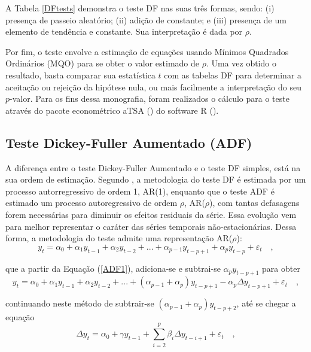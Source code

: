 A Tabela \ref{DFtests} demonstra o teste DF nas suas três formas, sendo: (i) presença de passeio aleatório; (ii) adição de constante; e (iii) presença de um elemento de tendência e constante. Sua interpretação é dada por $\rho$. 


Por fim, o teste envolve a estimação de equações usando Mínimos Quadrados Ordinários (MQO) para se obter o valor estimado de $\rho$. Uma vez obtido o resultado, basta comparar sua estatística $t$ com as tabelas DF para determinar a aceitação ou rejeição da hipótese nula, ou mais facilmente a interpretação do seu $p$-valor. Para os fins dessa monografia, foram realizados o cálculo para o teste através do pacote econométrico aTSA () do software R ().

\subsection{Teste Dickey-Fuller Aumentado (ADF)}

A diferença entre o teste Dickey-Fuller Aumentado e o teste DF simples, está na sua ordem de estimação. Segundo , a metodologia do teste DF é estimada por um processo autorregressivo de ordem 1, AR(1), enquanto que o teste ADF é estimado um processo autoregressivo de ordem $\rho$, AR($\rho$), com tantas defasagens forem necessárias para diminuir os efeitos residuais da série. Essa evolução vem para melhor representar o caráter das séries temporais não-estacionárias. Dessa forma, a metodologia do teste admite uma representação AR($\rho$): 
\begin{equation}\label{ADF1}
    y_t = \alpha_0 + \alpha_1 y_{t-1} + \alpha_2 y_{t-2} + ... + \alpha_{p-1} y_{t-p+1} + \alpha_p y_{t-p} + \varepsilon_t\quad,
\end{equation}

\noindent que a partir da Equação (\ref{ADF1}), adiciona-se e subtrai-se $\alpha_p y_{t-p+1}$ para obter
\begin{equation}\label{ADF2}
    y_t = \alpha_0 + \alpha_1 y_{t-1} + \alpha_2 y_{t-2} + ... + (\alpha_{p-1} + \alpha_p) y_{t-p+1} - \alpha_p \Delta y_{t-p+1} + \varepsilon_t \quad,
\end{equation}

\noindent continuando neste método de subtrair-se $(\alpha_{p-1} + \alpha_p)y_{t-p+2}$, até se chegar a equação
\begin{equation}\label{ADF3}
    \Delta y_t = \alpha_0 + \gamma y_{t-1} + \sum^{p}_{i=2} \beta_i \Delta y_{t-i+1} + \varepsilon_t \quad,
\end{equation}

